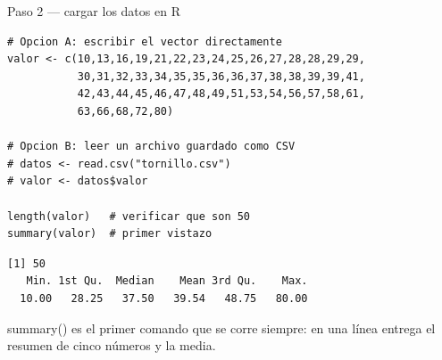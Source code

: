 \documentclass[aspectratio=169,10pt]{beamer}
\newcommand{\fx}[1]{{\ttfamily\color{uniAzul}#1}}
\begin{document}
\begin{frame}[fragile]{Paso 2 — cargar los datos en R}
  \footnotesize
\begin{lstlisting}[style=Rcode]
# Opcion A: escribir el vector directamente
valor <- c(10,13,16,19,21,22,23,24,25,26,27,28,28,29,29,
           30,31,32,33,34,35,35,36,36,37,38,38,39,39,41,
           42,43,44,45,46,47,48,49,51,53,54,56,57,58,61,
           63,66,68,72,80)

# Opcion B: leer un archivo guardado como CSV
# datos <- read.csv("tornillo.csv")
# valor <- datos$valor

length(valor)   # verificar que son 50
summary(valor)  # primer vistazo
\end{lstlisting}
\begin{lstlisting}[style=Rout]
[1] 50
   Min. 1st Qu.  Median    Mean 3rd Qu.    Max.
  10.00   28.25   37.50   39.54   48.75   80.00
\end{lstlisting}

  \vspace{-0.1cm}
  {\tiny\color{uniGris} \fx{summary()} es el primer comando que se corre
  siempre: en una línea entrega el resumen de cinco números y la media.}
\end{frame}

\end{document}
